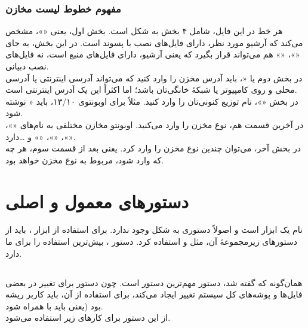 \subsubsection{مفهوم خطوط لیست مخازن}
هر خط در این فایل، شامل ۴ بخش به شکل  است. بخش اول، یعنی «»، مشخص می‌کند که آرشیو مورد نظر، دارای فایل‌های نصب با پسوند  است. در این بخش، به جای «»، «» هم می‌تواند قرار بگیرد که یعنی آرشیو، دارای فایل‌های منبع است، نه فایل‌های نصب دبیانی.\\
در بخش دوم یا «، باید آدرس مخزن را وارد کنید که می‌تواند آدرسی اینترنتی یا آدرسی محلی و روی کامپیوتر یا شبکهٔ خانگی‌تان باشد؛ اما اکثراً این یک آدرس اینترنتی است.\\
در بخش «»، نام توزیع کنونی‌تان را وارد کنید. مثلاً برای اوبونتوی ۱۳/۱۰، باید « نوشته شود.\\
در آخرین قسمت هم، نوع مخزن را وارد می‌کنید. اوبونتو مخازن مختلفی به نام‌های «»، «»، «»، «» و \ldots دارد.\\
در بخش آخر، می‌توان چندین نوع مخزن را وارد کرد. یعنی بعد از قسمت سوم، هر چه که وارد شود، مربوط به نوع مخزن خواهد بود.

\section[دستورهای معمول و اصلی Apt]{دستورهای معمول و اصلی }
 نام یک ابزار است و اصولاً دستوری به شکل  وجود ندارد. برای استفاده از ابزار ، باید از دستورهای زیرمجموعهٔ آن، مثل  و  استفاده کرد. دستور ، بیش‌ترین استفاده را برای ما دارد.

\subsection[apt-get]{}
همان‌گونه که گفته شد، دستور  مهم‌ترین دستور است. چون دستور برای تغییر در بعضی فایل‌ها و پوشه‌های کل سیستم تغییر ایجاد می‌کند، برای استفاده از آن، باید کاربر ریشه بود (یعنی باید با  همراه شود.\\
از این دستور برای کارهای زیر استفاده می‌شود.

